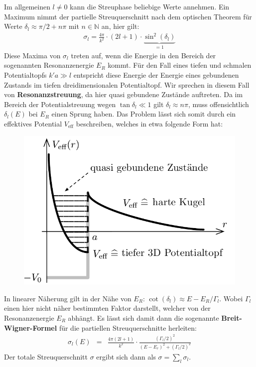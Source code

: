 Im allgemeinen $l\neq0$ kann die Streuphase beliebige Werte annehmen. Ein Maximum nimmt der partielle Streuquerschnitt nach dem optischen Theorem für Werte $\delta_l \approx\pi/2+n\pi$ mit $n\in \mathbb{N}$ an, hier gilt: 
\begin{eqnarray*}
	\sigma_l = \frac{4\pi}{k^2}\cdot (2l +1)\cdot \underbrace{\sin^2(\delta_l)}_{=1}
\end{eqnarray*}
Diese Maxima von $\sigma_l$ treten auf, wenn die Energie in den Bereich der sogenannten Resonanzenergie $E_R$ kommt. Für den Fall eines tiefen und schmalen Potentialtopfs $k'a\gg l$ entspricht diese Energie der Energie eines gebundenen Zustands im tiefen dreidimensionalen Potentialtopf. Wir sprechen in diesem Fall von {\bf Resonanzstreuung}, da hier quasi gebundene Zustände auftreten. Da im Bereich der Potentialstreuung wegen $\tan\delta_l\ll1$ gilt $\delta_l\approx n\pi$, muss offensichtlich $\delta_l(E)$ bei $E_R$ einen Sprung haben. Das Problem lässt sich somit durch ein effektives Potential $V_{\text{eff}}$ beschreiben, welches in etwa folgende Form hat: 
\begin{figure}[!h]\center
	\includegraphics[scale=0.75]{Figs/Veff} 
\end{figure}\vspace{-4ex} 

In linearer Näherung gilt in der Nähe von $E_R$: $\cot(\delta_l)\approx E-E_R/\Gamma_l$. Wobei $\Gamma_l$ einen hier nicht näher bestimmten Faktor darstellt, welcher von der Resonanzenergie $E_R$ abhängt. Es lässt sich damit dann die sogenannte \textbf{Breit-Wigner-Formel} für die partiellen Streuquerschnitte herleiten: 
\begin{eqnarray*}
	\sigma_l(E) &=& \frac{4\pi(2l+1)}{k^2}\cdot \frac{(\Gamma_l/2)^2}{(E-E_r)^2+(\Gamma_l/2)^2}
\end{eqnarray*}
Der totale Streuquerschnitt $\sigma$ ergibt sich dann als $\sigma=\sum_l\sigma_l$. 

%